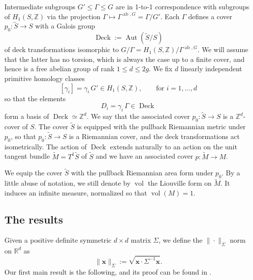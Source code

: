 \documentclass[11pt,letterpaper]{amsart}
\newcommand \R {{ \mathbb R}}
\newcommand \Z {{ \mathbb Z}}
\newcommand \tS {{\widetilde S}}
\newcommand \tM {{\widetilde M}}
\newcommand{\xb}{\mathbf{x}}
\newcommand{\Aut}{%
\operatorname{Aut}
}
\DeclareMathOperator{\vol}{vol}
\DeclareMathOperator{\Deck}{Deck}
\DeclareMathOperator{\abel}{ab}
\theoremstyle{definition}
\begin{document}
Intermediate subgroups $G' \leq \Gamma \leq G$ are in 1-to-1 correspondence with subgroups of $H_1(S,\Z)$ via the projection $\Gamma \mapsto \Gamma^{\abel, G} = \Gamma/G'$. Each $\Gamma$ defines a cover $p_0 \colon \tS \to S$ with a Galois group
\[
\Deck := \Aut(\tS / S)
\]
of deck transformations isomorphic to $G/\Gamma = H_1(S,\Z) /  \Gamma^{\abel, G}$. We will assume that the latter has no torsion, which is always the case up to a finite cover, and hence is a free abelian group of rank $1\leq d \leq 2g$.
We fix $d$ linearly independent primitive homology classes
\[
[\gamma_i] =  \gamma_i \, G' \in H_1(S,\Z), \qquad \text{for $i=1,\dots , d$}
\]
so that the elements
\[
D_i =  \gamma_i \, \Gamma \in \Deck
\]
form a basis of $\Deck \simeq \Z^d$.
We say that the associated cover $p_0 \colon \tS \to S$ is a $\Z^d$-cover of $S$.
The cover $\tS$ is equipped with the pullback Riemannian metric under $p_0$, so that $p_0 \colon \tS \to S$ is a Riemannian cover, and the deck transformations act isometrically.
The action of $\Deck$ extends naturally to an action on the unit tangent bundle $\tM = T^1\tS$ of $\tS$ and we have an associated cover $p \colon \tM \to M$.

We equip the cover $\tS$ with the pullback Riemannian area form under $p_0$. By a little abuse of notation, we still denote by $\vol$ the Liouville form on $\tM$. It induces an infinite measure, normalized so that $\vol(M)=1$.

\subsection{The results} Given a positive definite symmetric $d \times d$ matrix $\Sigma$, we define the $\|\cdot\|_{\Sigma}$ norm on $\R^d$ as
\[
\|\xb\|_{\Sigma} := \sqrt{\xb \cdot \Sigma^{-1} \xb}.
\]
Our first main result is the following, and its proof can be found in .
\end{document}
